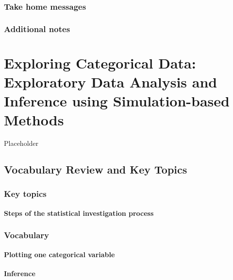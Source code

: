 \documentclass[
]{report}
\begin{document}
\subsection{Take home messages}\label{take-home-messages-4}

\subsection{Additional notes}\label{additional-notes-4}

\chapter{Exploring Categorical Data: Exploratory Data Analysis and Inference using Simulation-based Methods}\label{exploring-categorical-data-exploratory-data-analysis-and-inference-using-simulation-based-methods}

Placeholder

\section{Vocabulary Review and Key Topics}\label{vocabulary-review-and-key-topics-2}

\subsection{Key topics}\label{key-topics-2}

\subsubsection*{Steps of the statistical investigation process}\label{steps-of-the-statistical-investigation-process-1}

\subsection{Vocabulary}\label{vocabulary-2}

\subsubsection*{Plotting one categorical variable}\label{plotting-one-categorical-variable}

\subsubsection*{Inference}\label{inference}
\end{document}
